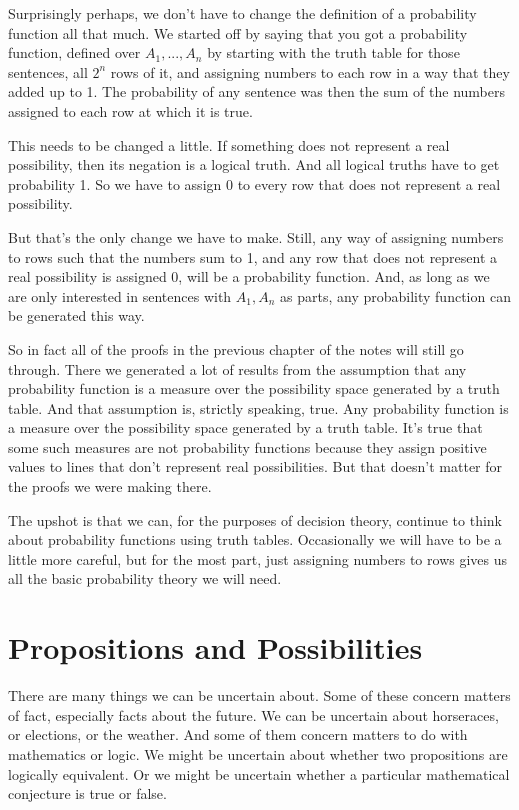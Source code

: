 Surprisingly perhaps, we don't have to change the definition of a probability function all that much. We started off by saying that you got a probability function, defined over $A_1, ...,  A_n$ by starting with the truth table for those sentences, all $2^n$ rows of it, and assigning numbers to each row in a way that they added up to 1. The probability of any sentence was then the sum of the numbers assigned to each row at which it is true.

This needs to be changed a little. If something does not represent a real possibility, then its negation is a logical truth. And all logical truths have to get probability 1. So we have to assign 0 to every row that does not represent a real possibility.

But that's the only change we have to make. Still, any way of assigning numbers to rows such that the numbers sum to 1, and any row that does not represent a real possibility is assigned 0, will be a probability function. And, as long as we are only interested in sentences with $A_1, A_n$ as parts, any probability function can be generated this way.

So in fact all of the proofs in the previous chapter of the notes will still go through. There we generated a lot of results from the assumption that any probability function is a measure over the possibility space generated by a truth table. And that assumption is, strictly speaking, true. Any probability function is a measure over the possibility space generated by a truth table. It's true that some such measures are not probability functions because they assign positive values to lines that don't represent real possibilities. But that doesn't matter for the proofs we were making there.

The upshot is that we can, for the purposes of decision theory, continue to think about probability functions using truth tables. Occasionally we will have to be a little more careful, but for the most part, just assigning numbers to rows gives us all the basic probability theory we will need.

\section{Propositions and Possibilities}
There are many things we can be uncertain about. Some of these concern matters of fact, especially facts about the future. We can be uncertain about horseraces, or elections, or the weather. And some of them concern matters to do with mathematics or logic. We might be uncertain about whether two propositions are logically equivalent. Or we might be uncertain whether a particular mathematical conjecture is true or false. 

